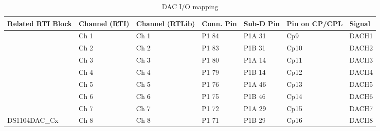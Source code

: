 \begin{table}[!h]
\begin{adjustbox}{width=1\textwidth}
\begin{tabular}{|l|l|l|l|l|l|l|}
\hline
\rowcolor[HTML]{34CDF9} 
Related RTI Block               & Channel (RTI) & Channel (RTLib) & Conn. Pin & Sub-D Pin & Pin on CP/CPL & Signal \\ \hline
                                & Ch 1          & Ch 1            & P1 84     & P1A 31    & Cp9           & DACH1  \\
                                & Ch 2          & Ch 2            & P1 83     & P1B 31    & Cp10          & DACH2  \\
                                & Ch 3          & Ch 3            & P1 80     & P1A 14    & Cp11          & DACH3  \\
                                & Ch 4          & Ch 4            & P1 79     & P1B 14    & Cp12          & DACH4  \\
                                & Ch 5          & Ch 5            & P1 76     & P1A 46    & Cp13          & DACH5  \\
                                & Ch 6          & Ch 6            & P1 75     & P1B 46    & Cp14          & DACH6  \\
                                & Ch 7          & Ch 7            & P1 72     & P1A 29    & Cp15          & DACH7  \\
\multirow[t]{-8}{*}{DS1104DAC\_Cx} & Ch 8          & Ch 8            & P1 71     & P1B 29    & Cp16          & DACH8  \\ \hline
\end{tabular}
\end{adjustbox}
\caption{DAC I/O mapping}
\label{DAC I/O mapping}
\end{table}